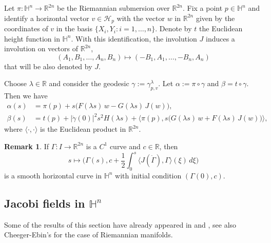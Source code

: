 \documentclass[10pt]{amsart}
\theoremstyle{definition}
\newtheorem{remark}[theorem]{Remark}
\theoremstyle{remark}
\numberwithin{equation}{section}
\begin{document}
Let $\pi:{{\mathbb{H}}}^n\to{{\mathbb{R}}}^{2n}$ be the Riemannian submersion over ${{\mathbb{R}}}^{2n}$.  Fix a point $p\in{{\mathbb{H}}}^n$ and identify a horizontal vector $v\in\mathcal{H}_{p}$ with the vector $w$ in ${{\mathbb{R}}}^{2n}$ given by the coordinates of $v$ in the basis $\{X_{i},Y_{i} : i=1,\ldots,n\}$. Denote by $t$ the Euclidean height function in ${{\mathbb{H}}}^n$.  With this identification, the involution $J$ induces a involution on vectors of ${{\mathbb{R}}}^{2n}$, 
\[
(A_{1},B_{1},\ldots ,A_{n},B_{n})\mapsto (-B_{1},A_{1},\ldots
,-B_{n},A_{n})
\]
that will be also denoted by $J$.

Choose ${\lambda}\in{{\mathbb{R}}}$ and consider the geodesic ${\gamma}:={\gamma}_{p,v}^{\lambda}$. Let $\alpha:=\pi\circ{\gamma}$ and $\beta=t\circ{\gamma}$. 
Then we have
\begin{equation}
\label{eq:geodesic2}
\begin{split}
\alpha(s)&=\pi(p)+s\big(F({\lambda} s)\,w-G({\lambda} s)\,J(w)\big) ,
\\
\beta(s)&=t(p)+|{\dot{\gamma}}(0)|^2s^2H({\lambda} s)+{\langle{\pi(p),s\big(G({\lambda} s)\,w
+F({\lambda} s)\,J(w)\big)}\rangle},
\end{split}
\end{equation}
where ${\langle{\cdot,\cdot}\rangle}$ is the Euclidean product in ${{\mathbb{R}}}^{2n}$.

\begin{remark}
If ${\Gamma}:I\to{{\mathbb{R}}}^{2n}$ is a $C^1$ curve and $c\in{{\mathbb{R}}}$, then
\[
s\mapsto \big({\Gamma}(s),c+\frac{1}{2}\int_0^s{\langle{J(\dot{\Gamma}),{\Gamma}}\rangle}(\xi)\,d\xi\big)
\]
is a smooth horizontal curve in ${{\mathbb{H}}}^n$ with initial condition $({\Gamma}(0),c)$.
\end{remark}

\subsection{Jacobi fields in ${{\mathbb{H}}}^n$}

Some of the results of this section have already appeared in \cite[\S~6]{MR1267892} and \cite{MR2548248}, see also Cheeger-Ebin's \cite{MR0458335} for the case of Riemannian manifolds.
\end{document}
